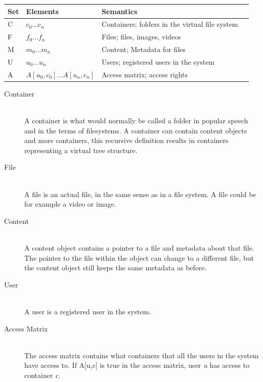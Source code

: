\documentclass[a4paper,12pt]{article}
\begin{document}
\begin{center}
    \begin{tabular}{ | l | l | l | p{5cm} |}
        \hline
        \textbf{Set} & \textbf{Elements} & \textbf{Semantics} \\ \hline
        C   & $c_0\dots c_n$                & Containers; folders in the virtual file system\\ \hline
        F   & $f_0\dots f_n$                & Files; files, images, videos\\ \hline
        M   & $m_0\dots m_n$                & Content; Metadata for files\\ \hline
        U   & $u_0\dots u_n$                & Users; registered users in the system\\ \hline
        A   & $A[u_0,c_0]\dots A[u_n, c_n]$ & Access matrix; access rights \\ \hline
    \end{tabular}
\end{center}

\begin{description}
\item[Container] \hfill \\
    A container is what would normally be called a folder in popular speech and in the terms of
    filesystems. A container can contain content objects and more containers, this recursive
    definition results in containers representing a virtual tree structure.

\item[File] \hfill \\
    A file is an actual file, in the same sense as in a file system. A file could be for example a
    video or image.

\item[Content] \hfill \\
    A content object contains a pointer to a file and metadata about that file. The pointer to the
    file within the object can change to a different file, but the content object still keeps the
    same metadata as before.

\item[User] \hfill \\
    A user is a registered user in the system.

\item[Access Matrix] \hfill \\
    The access matrix contains what containers that all the users in the system have access to. If
    A[u,c] is true in the access matrix, user \textit{u} has access to container \textit{c}.

\end{description}
\end{document}
